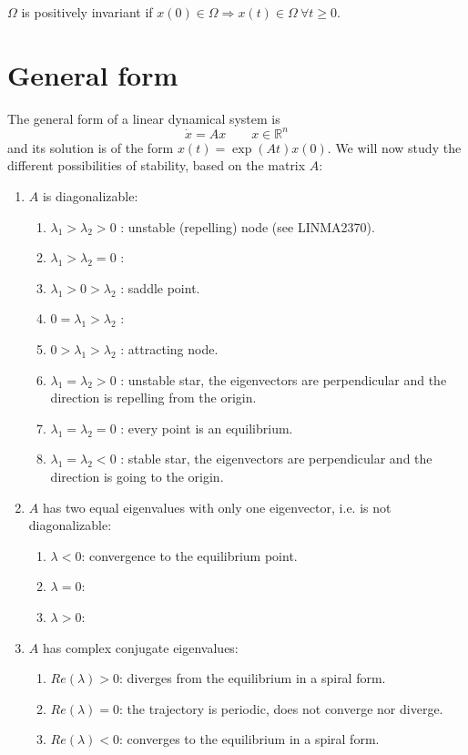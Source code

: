 \documentclass[12pt, openany]{report}
\begin{document}
\(\Omega\) is positively invariant if \(x(0)\in \Omega\Longrightarrow x(t)\in \Omega \: \forall t\ge 0\). 
\section{General form}
The general form of a linear dynamical system is 
\begin{equation}
    \dot x=Ax \qquad x\in \mathbb{R}^n
\end{equation}
and its solution is of the form \(x(t) = \exp(At)x(0)\). We will now study the different possibilities of stability, based on the matrix \(A\):
\begin{enumerate}
    \item \(A\) is diagonalizable:
    \begin{enumerate}
        \item \(\lambda_1>\lambda_2>0\) : unstable (repelling) node (see LINMA2370).
        \item \(\lambda_1>\lambda_2=0\) : 
        \item \(\lambda_1>0>\lambda_2\) : saddle point.
        \item \(0=\lambda_1>\lambda_2\) : 
        \item \(0>\lambda_1>\lambda_2\) : attracting node.
        \item \(\lambda_1=\lambda_2>0\) : unstable star, the eigenvectors are perpendicular and the direction is repelling from the origin.
        \item \(\lambda_1=\lambda_2=0\) : every point is an equilibrium.
        \item \(\lambda_1=\lambda_2<0\) : stable star, the eigenvectors are perpendicular and the direction is going to the origin.
    \end{enumerate}
    \item \(A\) has two equal eigenvalues with only one eigenvector, i.e. is not diagonalizable:
    \begin{enumerate}
        \item \(\lambda<0\): convergence to the equilibrium point.
        \item \(\lambda=0\): 
        \item \(\lambda>0\):
    \end{enumerate}
    \item \(A\) has complex conjugate eigenvalues:
    \begin{enumerate}
        \item \(Re(\lambda)>0\): diverges from the equilibrium in a spiral form.
        \item \(Re(\lambda)=0\): the trajectory is periodic, does not converge nor diverge.
        \item \(Re(\lambda)<0\): converges to the equilibrium in a spiral form.
    \end{enumerate}
\end{enumerate}
\end{document}
